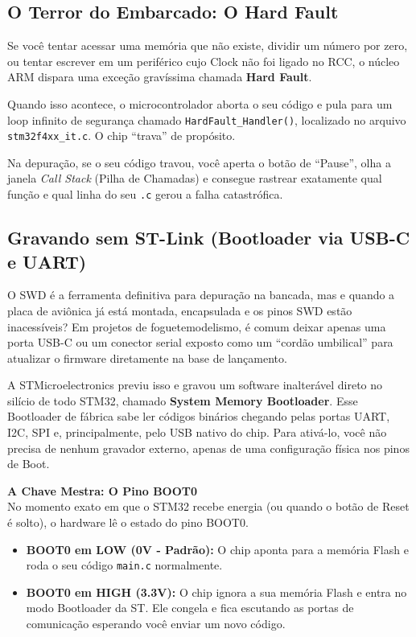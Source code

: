 \documentclass[12pt,a4paper]{article}
\begin{document}
\subsection{O Terror do Embarcado: O Hard Fault}
Se você tentar acessar uma memória que não existe, dividir um número por zero, ou tentar escrever em um periférico cujo Clock não foi ligado no RCC, o núcleo ARM dispara uma exceção gravíssima chamada \textbf{Hard Fault}.

Quando isso acontece, o microcontrolador aborta o seu código e pula para um loop infinito de segurança chamado \texttt{HardFault\_Handler()}, localizado no arquivo \texttt{stm32f4xx\_it.c}. O chip ``trava'' de propósito.

Na depuração, se o seu código travou, você aperta o botão de ``Pause'', olha a janela \textit{Call Stack} (Pilha de Chamadas) e consegue rastrear exatamente qual função e qual linha do seu \texttt{.c} gerou a falha catastrófica.

\subsection{Gravando sem ST-Link (Bootloader via USB-C e UART)}
O SWD é a ferramenta definitiva para depuração na bancada, mas e quando a placa de aviônica já está montada, encapsulada e os pinos SWD estão inacessíveis? Em projetos de foguetemodelismo, é comum deixar apenas uma porta USB-C ou um conector serial exposto como um ``cordão umbilical'' para atualizar o firmware diretamente na base de lançamento.

A STMicroelectronics previu isso e gravou um software inalterável direto no silício de todo STM32, chamado \textbf{System Memory Bootloader}.
Esse Bootloader de fábrica sabe ler códigos binários chegando pelas portas UART, I2C, SPI e, principalmente, pelo USB nativo do chip. Para ativá-lo, você não precisa de nenhum gravador externo, apenas de uma configuração física nos pinos de Boot.



\textbf{A Chave Mestra: O Pino BOOT0}\\
No momento exato em que o STM32 recebe energia (ou quando o botão de Reset é solto), o hardware lê o estado do pino BOOT0.
\begin{itemize}
    \item \textbf{BOOT0 em LOW (0V - Padrão):} O chip aponta para a memória Flash e roda o seu código \texttt{main.c} normalmente.
    \item \textbf{BOOT0 em HIGH (3.3V):} O chip ignora a sua memória Flash e entra no modo Bootloader da ST. Ele congela e fica escutando as portas de comunicação esperando você enviar um novo código.
\end{itemize}
\end{document}
